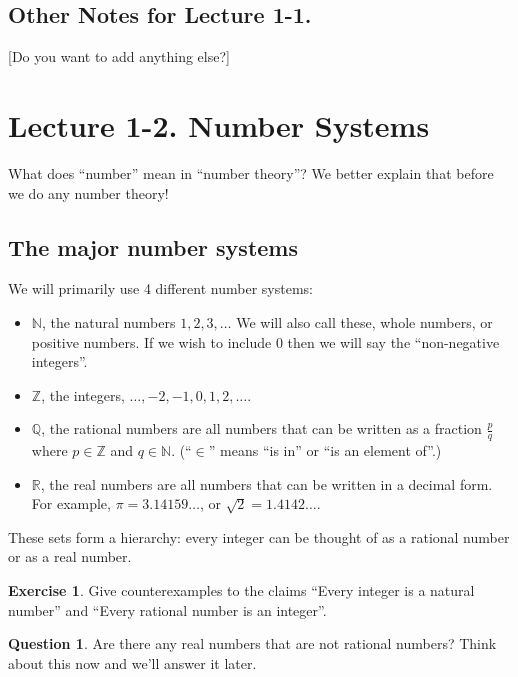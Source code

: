 \documentclass[11pt]{article}
\theoremstyle{definition}
\newtheorem{exercise}{Exercise}
\newtheorem{question}[thm]{Question}
\numberwithin{thm}{section}
\begin{document}
\subsection{Other Notes for Lecture 1-1.}

[Do you want to add anything else?]

\newpage
\section{Lecture 1-2. Number Systems}

What does ``number'' mean in ``number theory''? We better explain that before we do any number theory!

\subsection{The major number systems}
We will primarily use 4 different number systems:

\begin{itemize}
	\item $\mathbb{N}$, the natural numbers $1, 2, 3, \ldots$ We will also call these, whole numbers, or positive numbers. If we wish to include $0$ then we will say the ``non-negative integers''.
    \item $\mathbb{Z}$, the integers, $\ldots, -2, -1, 0, 1, 2, \ldots$. 
    \item $\mathbb{Q}$, the rational numbers are all numbers that can be written as a fraction $\frac{p}{q}$ where $p \in \mathbb{Z}$ and $q \in \mathbb{N}$. (``$\in$'' means ``is in'' or ``is an element of''.)
    \item $\mathbb{R}$, the real numbers are all numbers that can be written in a decimal form. For example, $\pi = 3.14159\ldots$, or $\sqrt{2} = 1.4142\ldots$.
\end{itemize}

These sets form a hierarchy: every integer can be thought of as a rational number or as a real number.

\begin{exercise} Give counterexamples to the claims ``Every integer is a natural number'' and ``Every rational number is an integer''.
\end{exercise}

\begin{question} Are there any real numbers that are not rational numbers? Think about this now and we'll answer it later.
\end{question}
\end{document}
